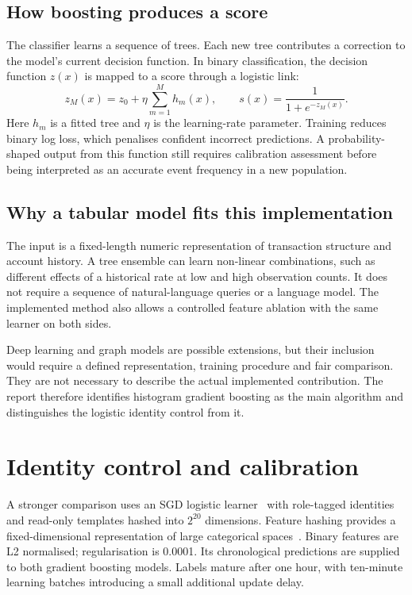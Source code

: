 \documentclass[12pt,a4paper,oneside]{report}
\begin{document}
\subsection{How boosting produces a score}
The classifier learns a sequence of trees. Each new tree contributes a correction to the model's current decision function. In binary classification, the decision function $z(x)$ is mapped to a score through a logistic link:
\begin{equation}z_M(x)=z_0+\eta\sum_{m=1}^{M}h_m(x),\qquad s(x)=\frac{1}{1+e^{-z_M(x)}}.\end{equation}
Here $h_m$ is a fitted tree and $\eta$ is the learning-rate parameter. Training reduces binary log loss, which penalises confident incorrect predictions. A probability-shaped output from this function still requires calibration assessment before being interpreted as an accurate event frequency in a new population.
\subsection{Why a tabular model fits this implementation}
The input is a fixed-length numeric representation of transaction structure and account history. A tree ensemble can learn non-linear combinations, such as different effects of a historical rate at low and high observation counts. It does not require a sequence of natural-language queries or a language model. The implemented method also allows a controlled feature ablation with the same learner on both sides.

Deep learning and graph models are possible extensions, but their inclusion would require a defined representation, training procedure and fair comparison. They are not necessary to describe the actual implemented contribution. The report therefore identifies histogram gradient boosting as the main algorithm and distinguishes the logistic identity control from it.

\section{Identity control and calibration}
A stronger comparison uses an SGD logistic learner~\cite{sgd} with role-tagged identities and read-only templates hashed into $2^{20}$ dimensions. Feature hashing provides a fixed-dimensional representation of large categorical spaces~\cite{hashing}. Binary features are L2 normalised; regularisation is 0.0001. Its chronological predictions are supplied to both gradient boosting models. Labels mature after one hour, with ten-minute learning batches introducing a small additional update delay.
\end{document}
